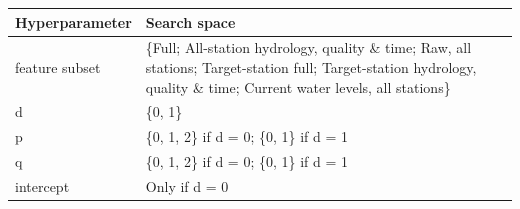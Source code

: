 \begin{tabularx}{\textwidth}{@{}lX@{}}
\toprule
\textbf{Hyperparameter} & \textbf{Search space} \\
\midrule
feature subset & \{Full; All-station hydrology, quality \& time; Raw, all stations; Target-station full; Target-station hydrology, quality \& time; Current water levels, all stations\} \\
\addlinespace
d & \{0, 1\} \\
\addlinespace
p & \{0, 1, 2\} if d = 0; \{0, 1\} if d = 1 \\
\addlinespace
q & \{0, 1, 2\} if d = 0; \{0, 1\} if d = 1 \\
\addlinespace
intercept & Only if d = 0 \\
\bottomrule
\end{tabularx}
